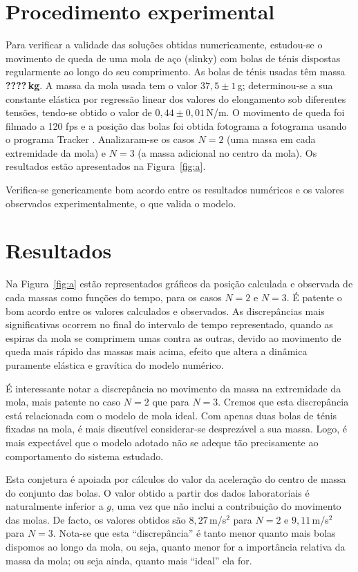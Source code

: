 \documentclass{article}
\begin{document}
\section*{Procedimento experimental}
Para verificar a validade das soluções obtidas numericamente, estudou-se o
movimento de queda de uma mola de aço (slinky) com bolas de ténis dispostas
regularmente ao longo do seu comprimento.  As bolas de ténis usadas têm massa
\textbf{\color{red}????\,kg}.  A massa da mola usada tem o valor $37,5\pm1$\,g;
determinou-se a sua constante elástica por regressão linear dos valores do
elongamento sob diferentes tensões, tendo-se obtido o valor de
$0,44\pm0,01$\,N/m.  O movimento de queda foi filmado a 120 fps e a posição das
bolas foi obtida fotograma a fotograma usando o programa Tracker \cite{Tracker}.
Analizaram-se os casos $N=2$ (uma massa em cada extremidade da mola) e $N=3$ (a
massa adicional no centro da mola). Os resultados estão apresentados na
Figura~\ref{fig:a}.

Verifica-se genericamente bom acordo entre os resultados numéricos e os valores
observados experimentalmente, o que valida o modelo.

\section*{Resultados}
Na Figura~\ref{fig:a}  estão representados gráficos da posição calculada e
observada de cada massas como funções do tempo, para os casos $N=2$ e $N=3$. É
patente o bom acordo entre os valores calculados e observados. As discrepâncias
mais significativas ocorrem no final do intervalo de tempo representado, quando
as espiras da mola se comprimem umas contra as outras, devido ao movimento de
queda mais rápido das massas mais acima, efeito que altera a dinâmica puramente
elástica e gravítica do modelo numérico.

É interessante notar a discrepância no movimento da massa na extremidade
da mola, mais patente no caso $N=2$ que para $N=3$. Cremos que esta discrepância
está relacionada com o modelo de mola ideal. Com apenas duas bolas de ténis
fixadas na mola, é mais discutível considerar-se desprezável a sua massa. Logo,
é mais expectável que o modelo adotado não se adeque tão precisamente ao
comportamento do sistema estudado.

Esta conjetura é apoiada por cálculos do valor da aceleração do centro de massa
do conjunto das bolas. O valor obtido a partir dos dados laboratoriais é
naturalmente inferior a $g$, uma vez que não inclui a contribuição do movimento
das molas. De facto, os valores obtidos são $8,27$\,m/s$^2$ para $N=2$ e
$9,11$\,m/s$^2$ para $N=3$.  Nota-se que esta ``discrepância'' é tanto menor
quanto mais bolas dispomos ao longo da mola, ou seja, quanto menor for a
importância relativa da massa da mola; ou seja ainda, quanto mais ``ideal'' ela
for.
\end{document}
